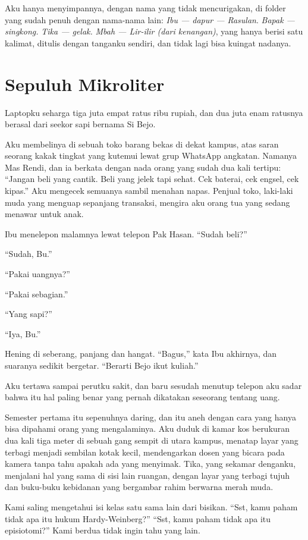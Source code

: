 \documentclass[11pt,twoside,openany]{book}
\makeatletter
\newcommand{\scenebreak}{\par\vspace{0.9em}{\centering\textsc{*\hspace{0.7em}*\hspace{0.7em}*}\par}\vspace{0.9em}\@afterindentfalse\@afterheading}
\makeatother
\begin{document}
Aku hanya menyimpannya, dengan nama yang tidak mencurigakan, di folder yang sudah penuh dengan nama-nama lain: \emph{Ibu --- dapur --- Rasulan}. \emph{Bapak --- singkong.} \emph{Tika --- gelak.} \emph{Mbah --- Lir-ilir (dari kenangan)}, yang hanya berisi satu kalimat, ditulis dengan tanganku sendiri, dan tidak lagi bisa kuingat nadanya.

\chapter{Sepuluh Mikroliter}
Laptopku seharga tiga juta empat ratus ribu rupiah, dan dua juta enam ratusnya berasal dari seekor sapi bernama Si Bejo.

Aku membelinya di sebuah toko barang bekas di dekat kampus, atas saran seorang kakak tingkat yang kutemui lewat grup WhatsApp angkatan. Namanya Mas Rendi, dan ia berkata dengan nada orang yang sudah dua kali tertipu: ``Jangan beli yang cantik. Beli yang jelek tapi sehat. Cek baterai, cek engsel, cek kipas.'' Aku mengecek semuanya sambil menahan napas. Penjual toko, laki-laki muda yang menguap sepanjang transaksi, mengira aku orang tua yang sedang menawar untuk anak.

Ibu menelepon malamnya lewat telepon Pak Hasan. ``Sudah beli?''

``Sudah, Bu.''

``Pakai uangnya?''

``Pakai sebagian.''

``Yang sapi?''

``Iya, Bu.''

Hening di seberang, panjang dan hangat. ``Bagus,'' kata Ibu akhirnya, dan suaranya sedikit bergetar. ``Berarti Bejo ikut kuliah.''

Aku tertawa sampai perutku sakit, dan baru sesudah menutup telepon aku sadar bahwa itu hal paling benar yang pernah dikatakan seseorang tentang uang.

\scenebreak
Semester pertama itu sepenuhnya daring, dan itu aneh dengan cara yang hanya bisa dipahami orang yang mengalaminya. Aku duduk di kamar kos berukuran dua kali tiga meter di sebuah gang sempit di utara kampus, menatap layar yang terbagi menjadi sembilan kotak kecil, mendengarkan dosen yang bicara pada kamera tanpa tahu apakah ada yang menyimak. Tika, yang sekamar denganku, menjalani hal yang sama di sisi lain ruangan, dengan layar yang terbagi tujuh dan buku-buku kebidanan yang bergambar rahim berwarna merah muda.

Kami saling mengetahui isi kelas satu sama lain dari bisikan. ``Sst, kamu paham tidak apa itu hukum Hardy-Weinberg?'' ``Sst, kamu paham tidak apa itu episiotomi?'' Kami berdua tidak ingin tahu yang lain.
\end{document}
